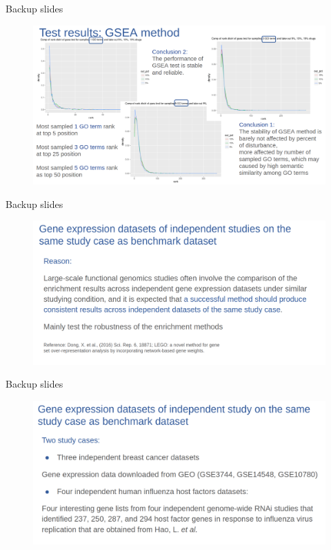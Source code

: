 \documentclass[10pt]{beamer}
\begin{document}
\begin{frame}[fragile]{Backup slides}
    \begin{figure}
        \includegraphics[width=12cm]{demo/images/test_perform_gsea_res.png}
    \end{figure}
\end{frame}
\begin{frame}[fragile]{Backup slides}
    \begin{figure}
        \includegraphics[width=12cm]{demo/images/ind_case1.png}
    \end{figure}
\end{frame}
\begin{frame}[fragile]{Backup slides}
    \begin{figure}
        \includegraphics[width=12cm]{demo/images/ind_case2.png}
    \end{figure}
\end{frame}
\end{document}
